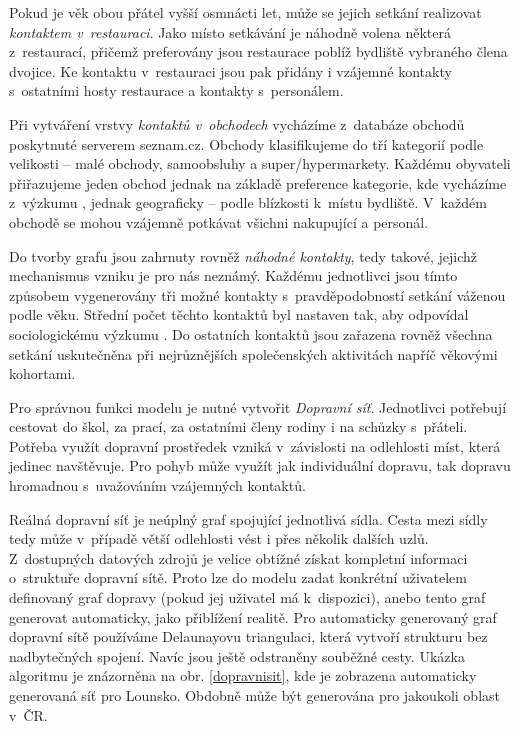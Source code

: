 Pokud je věk obou přátel vyšší osmnácti let, může se jejich setkání realizovat \emph{kontaktem v~restauraci}. Jako místo setkávání je náhodně volena některá z~restaurací, přičemž preferovány jsou restaurace poblíž bydliště vybraného člena dvojice. Ke kontaktu v~restauraci jsou pak přidány i vzájemné kontakty s~ostatními hosty restaurace a kontakty s~personálem.


Při vytváření vrstvy \emph{kontaktů v~obchodech} vycházíme z~databáze obchodů poskytnuté serverem seznam.cz. Obchody klasifikujeme do tří kategorií podle velikosti -- malé obchody, samoobsluhy a super/hypermarkety. Každému obyvateli přiřazujeme jeden obchod jednak na základě preference kategorie, kde vycházíme z~výzkumu \cite{zaj:medianlife}, jednak geograficky -- podle blízkosti k~místu bydliště. V~každém obchodě se mohou vzájemně potkávat všichni nakupující a personál.

Do tvorby grafu jsou zahrnuty rovněž \emph{náhodné kontakty}, tedy takové, jejichž mechanismus vzniku je pro nás neznámý. Každému jednotlivci jsou tímto způsobem vygenerovány tři možné kontakty s~pravděpodobností setkání váženou podle věku. Střední počet těchto kontaktů byl nastaven tak, aby odpovídal sociologickému výzkumu \cite{Prem_etal2017}. Do ostatních kontaktů jsou zařazena rovněž všechna setkání uskutečněna při nejrůznějších společenských aktivitách napříč věkovými kohortami.

Pro správnou funkci modelu je nutné vytvořit \emph{Dopravní síť}. Jednotlivci potřebují cestovat do škol, za prací, za ostatními členy rodiny i na schůzky s~přáteli. Potřeba využít dopravní prostředek vzniká v~závislosti na odlehlosti míst, která jedinec navštěvuje. Pro pohyb může využít jak individuální dopravu, tak dopravu hromadnou s~uvažováním vzájemných kontaktů. 

Reálná dopravní síť je neúplný graf spojující jednotlivá sídla. Cesta mezi sídly tedy může v~případě větší odlehlosti vést i přes několik dalších uzlů. Z~dostupných datových zdrojů je velice obtížné získat kompletní informaci o~struktuře dopravní sítě. Proto lze do modelu zadat konkrétní uživatelem definovaný graf dopravy (pokud jej uživatel má k~dispozici), anebo tento graf generovat automaticky, jako přiblížení realitě. Pro automaticky generovaný graf dopravní sítě používáme Delaunayovu triangulaci, která vytvoří strukturu bez nadbytečných spojení. Navíc jsou ještě odstraněny souběžné cesty. Ukázka algoritmu je znázorněna na
obr. \ref{dopravnisit}, kde je zobrazena automaticky generovaná síť pro Lounsko. Obdobně může být generována pro jakoukoli oblast v~ČR. 


